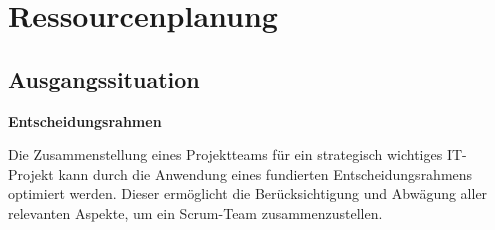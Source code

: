 \chapter{Ressourcenplanung}

\label{chapter:4}
\section{Ausgangssituation}
\textbf{Entscheidungsrahmen}
\vspace*{0.1cm}

Die Zusammenstellung eines Projektteams für ein strategisch wichtiges IT-Projekt kann durch die Anwendung eines fundierten Entscheidungsrahmens optimiert werden. Dieser ermöglicht die Berücksichtigung und Abwägung aller relevanten Aspekte, um ein Scrum-Team zusammenzustellen.

